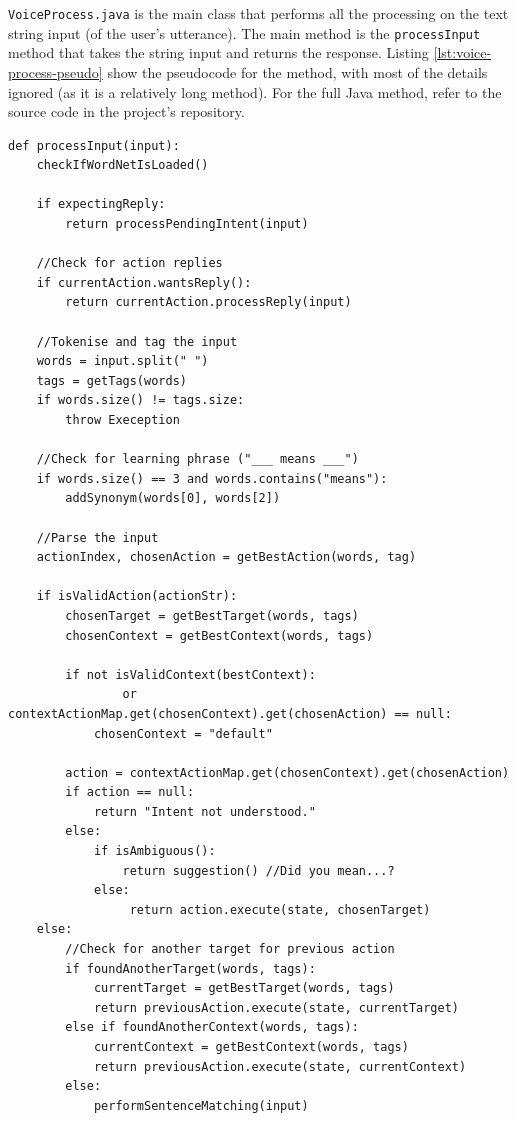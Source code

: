 \documentclass[11pt]{article}
\begin{document}
\texttt{VoiceProcess.java} is the main class that performs all the processing on the text string input (of the user's utterance). The main method is the \texttt{processInput} method that takes the string input and returns the response. Listing \ref{lst:voice-process-pseudo} show the pseudocode for the method, with most of the details ignored (as it is a relatively long method). For the full Java method, refer to the source code in the project's repository.

\begin{lstlisting}[caption=VoiceProcess.processInput() pseudocode, label={lst:voice-process-pseudo}]
def processInput(input):
    checkIfWordNetIsLoaded()
    
    if expectingReply:
        return processPendingIntent(input)
    
    //Check for action replies
    if currentAction.wantsReply():
        return currentAction.processReply(input)
    
    //Tokenise and tag the input
    words = input.split(" ")
    tags = getTags(words)
    if words.size() != tags.size:
        throw Exeception
    
    //Check for learning phrase ("___ means ___")
    if words.size() == 3 and words.contains("means"):
        addSynonym(words[0], words[2])
    
    //Parse the input
    actionIndex, chosenAction = getBestAction(words, tag)
    
    if isValidAction(actionStr):
        chosenTarget = getBestTarget(words, tags)
        chosenContext = getBestContext(words, tags)
        
        if not isValidContext(bestContext):
                or contextActionMap.get(chosenContext).get(chosenAction) == null:
            chosenContext = "default"
            
        action = contextActionMap.get(chosenContext).get(chosenAction)
        if action == null:
            return "Intent not understood."
        else:
            if isAmbiguous():
                return suggestion()	//Did you mean...?
            else:
                 return action.execute(state, chosenTarget)
    else:
    	//Check for another target for previous action
        if foundAnotherTarget(words, tags):
            currentTarget = getBestTarget(words, tags)
            return previousAction.execute(state, currentTarget)
        else if foundAnotherContext(words, tags):
            currentContext = getBestContext(words, tags)
            return previousAction.execute(state, currentContext)
        else:
            performSentenceMatching(input)
\end{lstlisting}
\end{document}

